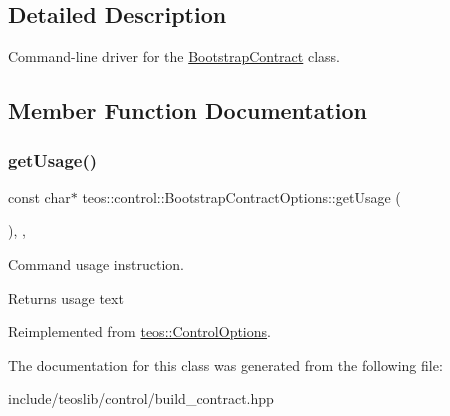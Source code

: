 \subsection{Detailed Description}
Command-\/line driver for the \mbox{\hyperlink{classteos_1_1control_1_1_bootstrap_contract}{Bootstrap\+Contract}} class. 

\subsection{Member Function Documentation}
\mbox{\label{classteos_1_1control_1_1_bootstrap_contract_options_af0f63b7aff6d7d41ac9b4b1c542b93f0}} 
\subsubsection{\texorpdfstring{get\+Usage()}{getUsage()}}
{\footnotesize\ttfamily const char$\ast$ teos\+::control\+::\+Bootstrap\+Contract\+Options\+::get\+Usage (\begin{DoxyParamCaption}{ }\end{DoxyParamCaption})\hspace{0.3cm}{\ttfamily [inline]}, {\ttfamily [protected]}, {\ttfamily [virtual]}}



Command \textquotesingle{}usage\textquotesingle{} instruction. 

\begin{DoxyReturn}{Returns}
usage text 
\end{DoxyReturn}


Reimplemented from \mbox{\hyperlink{classteos_1_1_control_options_a0aa5671f9bc750ed5280c26c543874f3}{teos\+::\+Control\+Options}}.



The documentation for this class was generated from the following file\+:\begin{DoxyCompactItemize}
\item 
include/teoslib/control/build\+\_\+contract.\+hpp\end{DoxyCompactItemize}
